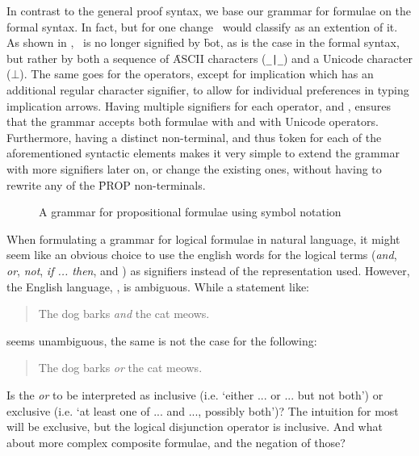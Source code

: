 \documentclass[BA.tex]{subfiles}
\begin{document}
In contrast to the general proof syntax, we base our grammar for
 formulae on the formal syntax. In fact, but for one change \ours\ would 
 classify as an extention of it.
 As shown in , \abs\ is no longer signified by
 \f{bot}, as is the case in the formal syntax, but rather by both a sequence 
 of \f{ASCII} characters (\verb+_|_+) and a Unicode character (\(\bot\)). 
 The same goes for the operators, except for implication which has an
 additional regular character signifier, to allow for individual preferences
 in typing implication arrows. Having multiple signifiers for each
 operator, and , ensures that the grammar
 accepts both formulae with  and with Unicode operators.
 Furthermore, having a distinct non-terminal, and thus \f{token}
 for each of the aforementioned syntactic elements makes it
 very simple to extend the grammar with more signifiers later on, or change
 the existing ones, without having to rewrite any of the \f{PROP} 
 non-terminals.

\begin{figure}[!hb]

\caption{A grammar for propositional formulae using symbol notation}
\label{nlform}
\end{figure}

When formulating a grammar for logical formulae in natural language, it
 might seem like an obvious choice to use the english words
 for the logical terms
 (\emph{and}, \emph{or}, \emph{not}, \emph{if ... then},  and \emph{\abs})
 as signifiers instead of the  representation used. However, 
 the English language, , is
 ambiguous. While a statement like:
 \begin{quote}
    The dog barks \emph{and} the cat meows.
 \end{quote}
 seems unambiguous, the same is not the case for the following:
 \begin{quote}
    The dog barks \emph{or} the cat meows.
 \end{quote}
 Is the \emph{or} to be interpreted as inclusive 
 (i.e. `either ... or ... but not both') or exclusive
 (i.e. `at least one of ... and ..., possibly both')? 
 The intuition for most will be exclusive, but the logical disjunction
 operator is inclusive. And what about more complex composite formulae,
 and the negation of those? 
 
\end{document}
